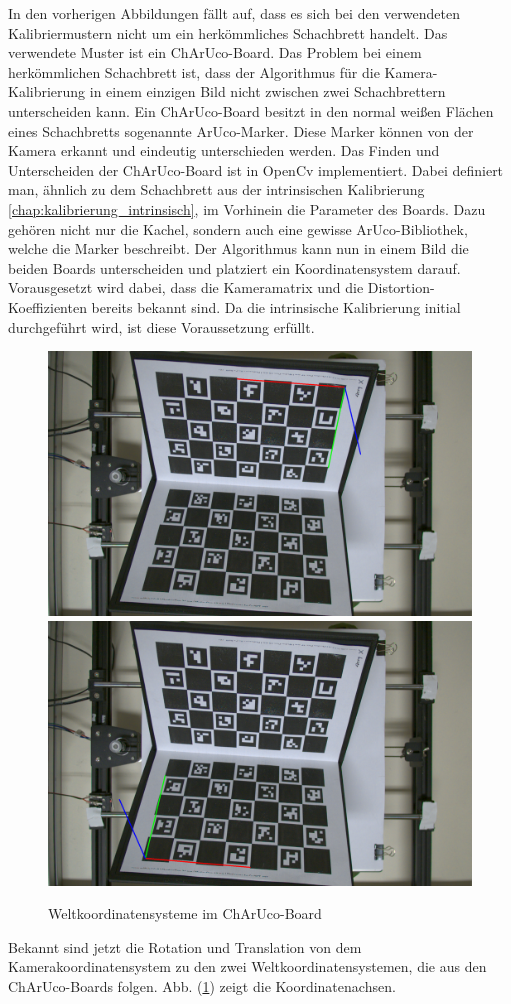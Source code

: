 		In den vorherigen Abbildungen fällt auf, dass es sich bei den verwendeten Kalibriermustern nicht um ein herkömmliches Schachbrett handelt. Das verwendete Muster ist ein ChArUco-Board. Das Problem bei einem herkömmlichen Schachbrett ist, dass der Algorithmus für die Kamera-Kalibrierung in einem einzigen Bild nicht zwischen zwei Schachbrettern unterscheiden kann. Ein ChArUco-Board besitzt in den normal weißen Flächen eines Schachbretts sogenannte ArUco-Marker. Diese Marker können von der Kamera erkannt und eindeutig unterschieden werden. Das Finden und Unterscheiden der ChArUco-Board ist in OpenCv implementiert. Dabei definiert man, ähnlich zu dem Schachbrett aus der intrinsischen Kalibrierung \ref{chap:kalibrierung_intrinsisch}, im Vorhinein die Parameter des Boards. Dazu gehören nicht nur die Kachel, sondern auch eine gewisse ArUco-Bibliothek, welche die Marker beschreibt. Der Algorithmus kann nun in einem Bild die beiden Boards unterscheiden und platziert ein Koordinatensystem darauf. Vorausgesetzt wird dabei, dass die Kameramatrix und die Distortion-Koeffizienten bereits bekannt sind. Da die intrinsische Kalibrierung initial durchgeführt wird, ist diese Voraussetzung erfüllt.  
		
		\begin{figure}[h]
			\centering
			\includegraphics[width=0.49\linewidth]{img/hauptteil/ext-calib/charuco_primary.png}
			\includegraphics[width=0.49\linewidth]{img/hauptteil/ext-calib/charuco_secondary.png}
			\caption{Weltkoordinatensysteme im ChArUco-Board}
			\label{fig:ext-calib-poses}
		\end{figure}
	
		Bekannt sind jetzt die Rotation und Translation von dem Kamerakoordinatensystem zu den zwei Weltkoordinatensystemen, die aus den ChArUco-Boards folgen. Abb. (\ref{fig:ext-calib-poses}) zeigt die Koordinatenachsen. 
		

